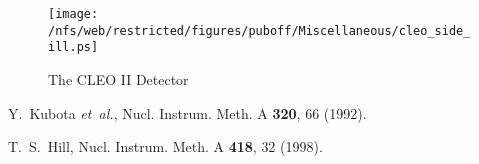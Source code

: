 \documentclass[aps,prl,twocolumn,superscriptaddress,showpacs]{revtex4}
\begin{document}
\begin{figure}
\texttt{[image: /nfs/web/restricted/figures/puboff/Miscellaneous/cleo\_side\_ill.ps]}
\caption{The CLEO II Detector}
\label{fig:cleo}
\end{figure}


\begin{thebibliography}{99}

Y.~Kubota {\it et~al.}, {Nucl. Instrum. Meth. A} \textbf{320}, {66} ({1992}).

T.~S.~Hill, {Nucl. Instrum. Meth. A} \textbf{{418}}, {32} ({1998}).

\end{thebibliography}
\end{document}
